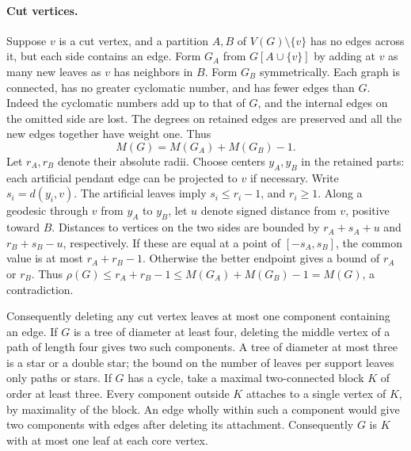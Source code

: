 \documentclass[11pt,a4paper]{article}
\begin{document}
\paragraph{Cut vertices.}
Suppose $v$ is a cut vertex, and a partition $A,B$ of $V(G)\setminus\{v\}$
has no edges across it, but each side contains an edge. Form $G_A$ from
$G[A\cup\{v\}]$ by adding at $v$ as many new leaves as $v$ has neighbors in
$B$. Form $G_B$ symmetrically. Each graph is connected, has no greater
cyclomatic number, and has fewer edges than $G$. Indeed the cyclomatic
numbers add up to that of $G$, and the internal edges on the omitted side
are lost. The degrees on retained edges are preserved and all the new
edges together have weight one. Thus
\[
 M(G)=M(G_A)+M(G_B)-1.
\]
Let $r_A,r_B$ denote their absolute radii. Choose centers $y_A,y_B$ in
the retained parts: each artificial pendant edge can be projected to
$v$ if necessary. Write $s_i=d(y_i,v)$. The artificial leaves imply
$s_i\le r_i-1$, and $r_i\ge1$. Along a geodesic through $v$ from $y_A$
to $y_B$, let $u$ denote signed distance from $v$, positive toward $B$.
Distances to vertices on the two sides are bounded by
$r_A+s_A+u$ and $r_B+s_B-u$, respectively. If these are equal at a
point of $[-s_A,s_B]$, the common value is at most $r_A+r_B-1$. Otherwise
the better endpoint gives a bound of $r_A$ or $r_B$. Thus
$\rho(G)\le r_A+r_B-1\le M(G_A)+M(G_B)-1=M(G)$, a contradiction.

Consequently deleting any cut vertex leaves at most one component containing
an edge. If $G$ is a tree of diameter at least four, deleting the middle
vertex of a path of length four gives two such components. A tree of
diameter at most three is a star or a double star; the bound on the number
of leaves per support leaves only paths or stars. If $G$ has a cycle,
take a maximal two-connected block $K$ of order at least three.
Every component outside $K$ attaches to a single vertex of $K$, by
maximality of the block. An edge wholly within such a component would
give two components with edges after deleting its attachment.
Consequently $G$ is $K$ with at most one leaf at each core vertex.
\end{document}

